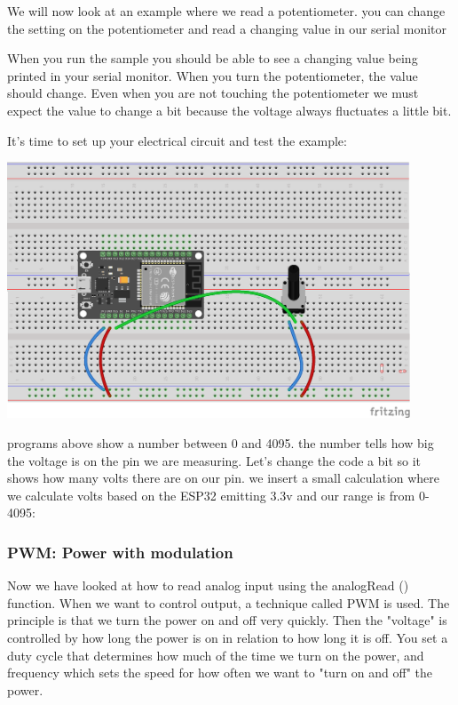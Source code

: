 \documentclass[12pt, a4paper]{article}
\begin{document}
We will now look at an example where we read a potentiometer. you can change the setting on the potentiometer and read a changing value in our serial monitor

When you run the sample you should be able to see a changing value being printed in your serial monitor. When you turn the potentiometer, the value should change. Even when you are not touching the potentiometer we must expect the value to change a bit because the voltage always fluctuates a little bit.

It's time to set up your electrical circuit and test the example:
\begin{center}
  \includegraphics[width=12cm, keepaspectratio]{fritzing/analogInput_potentiometer.png}
\end{center}



programs above show a number between 0 and 4095. the number tells how big the voltage is on the pin we are measuring. Let's change the code a bit so it shows how many volts there are on our pin. we insert a small calculation where we calculate volts based on the ESP32 emitting 3.3v and our range is from 0-4095:



\subsubsection{PWM: Power with modulation}

Now we have looked at how to read analog input using the analogRead () function. When we want to control output, a technique called PWM is used. The principle is that we turn the power on and off very quickly. Then the "voltage" is controlled by how long the power is on in relation to how long it is off.
You set a duty cycle that determines how much of the time we turn on the power, and frequency which sets the speed for how often we want to "turn on and off" the power.
\end{document}
